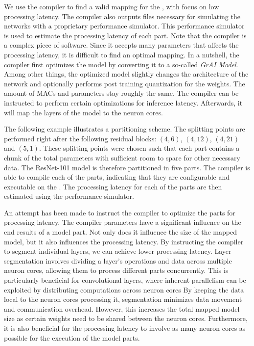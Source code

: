 We use the compiler to find a valid mapping for the \graicore{}, with focus on low processing latency.
The compiler also outputs files necessary for simulating the networks with a proprietary performance simulator.
This performance simulator is used to estimate the processing latency of each part.
Note that the compiler is a complex piece of software.
Since it accepts many parameters that affects the processing latency, it is difficult to find an optimal mapping. 
In a nutshell, the compiler first optimizes the model by converting it to a so-called \textit{GrAI Model}.
Among other things, the optimized model slightly changes the architecture of the network and optionally performs post training quantization \autocite{krishnamoorthiQuantizingDeepConvolutional2018} for the weights.
The amount of MACs and parameters stay roughly the same.
The compiler can be instructed to perform certain optimizations for inference latency.
Afterwards, it will map the layers of the model to the neuron cores.

The following example illustrates a partitioning scheme.
The splitting points are performed right after the following residual blocks: $(4, 6)$, $(4, 12)$, $(4,21)$ and $(5,1)$.
These splitting points were chosen such that each part contains a chunk of the total parameters with sufficient room to spare for other necessary data.
The ResNet-101 model is therefore partitioned in five parts.
The compiler is able to compile each of the parts, indicating that they are configurable and executable on the \graicore{}.
The processing latency for each of the parts are then estimated using the performance simulator.

An attempt has been made to instruct the compiler to optimize the parts for processing latency.
The compiler parameters have a significant influence on the end results of a model part.
Not only does it influence the size of the mapped model, but it also influences the processing latency.
By instructing the compiler to segment individual layers, we can achieve lower processing latency.
Layer segmentation involves dividing a layer's operations and data across multiple neuron cores, allowing them to process different parts concurrently.
This is particularly beneficial for convolutional layers, where inherent parallelism can be exploited by distributing computations across neuron cores
By keeping the data local to the neuron cores processing it, segmentation minimizes data movement and communication overhead.
However, this increases the total mapped model size as certain weights need to be shared between the neuron cores.
Furthermore, it is also beneficial for the processing latency to involve as many neuron cores as possible for the execution of the model parts.

